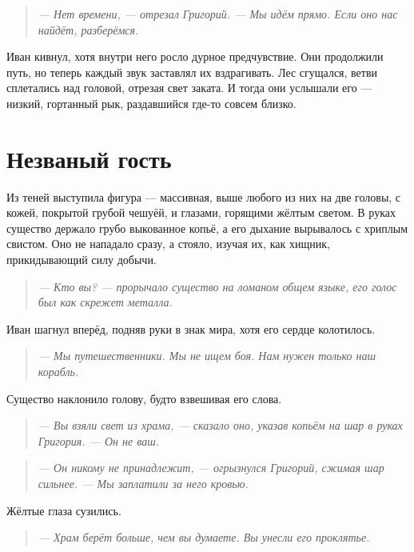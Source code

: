 \documentclass[12pt,a4paper]{book}
\newenvironment{dialogue}{\begin{quote}\itshape}{\end{quote}} %
\begin{document}
\begin{dialogue}
--- Нет времени, --- отрезал Григорий. --- Мы идём прямо. Если оно нас найдёт, разберёмся.
\end{dialogue}

Иван кивнул, хотя внутри него росло дурное предчувствие. Они продолжили путь, но теперь каждый звук заставлял их вздрагивать. Лес сгущался, ветви сплетались над головой, отрезая свет заката. И тогда они услышали его --- низкий, гортанный рык, раздавшийся где-то совсем близко.

\section*{Незваный гость}

Из теней выступила фигура --- массивная, выше любого из них на две головы, с кожей, покрытой грубой чешуёй, и глазами, горящими жёлтым светом. В руках существо держало грубо выкованное копьё, а его дыхание вырывалось с хриплым свистом. Оно не нападало сразу, а стояло, изучая их, как хищник, прикидывающий силу добычи.

\begin{dialogue}
--- Кто вы? --- прорычало существо на ломаном общем языке, его голос был как скрежет металла.
\end{dialogue}

Иван шагнул вперёд, подняв руки в знак мира, хотя его сердце колотилось.

\begin{dialogue}
--- Мы путешественники. Мы не ищем боя. Нам нужен только наш корабль.
\end{dialogue}

Существо наклонило голову, будто взвешивая его слова.

\begin{dialogue}
--- Вы взяли свет из храма, --- сказало оно, указав копьём на шар в руках Григория. --- Он не ваш.
\end{dialogue}

\begin{dialogue}
--- Он никому не принадлежит, --- огрызнулся Григорий, сжимая шар сильнее. --- Мы заплатили за него кровью.
\end{dialogue}

Жёлтые глаза сузились.

\begin{dialogue}
--- Храм берёт больше, чем вы думаете. Вы унесли его проклятье.
\end{dialogue}
\end{document}

